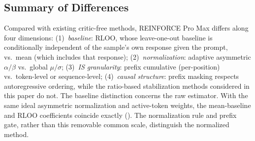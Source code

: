 \subsection{Summary of Differences}

Compared with existing critic-free methods, REINFORCE Pro Max differs along four dimensions: (1)~\emph{baseline}: RLOO, whose leave-one-out baseline is conditionally independent of the sample's own response given the prompt, vs.\ mean (which includes that response); (2)~\emph{normalization}: adaptive asymmetric $\alpha/\beta$ vs.\ global $\mu/\sigma$; (3)~\emph{IS granularity}: prefix cumulative (per-position) vs.\ token-level or sequence-level; (4)~\emph{causal structure}: prefix masking respects autoregressive ordering, while the ratio-based stabilization methods considered in this paper do not.
The baseline distinction concerns the raw estimator. With the same ideal
asymmetric normalization and active-token weights, the mean-baseline and
RLOO coefficients coincide exactly
(). The normalization rule and
prefix gate, rather than this removable common scale, distinguish the
normalized method.
